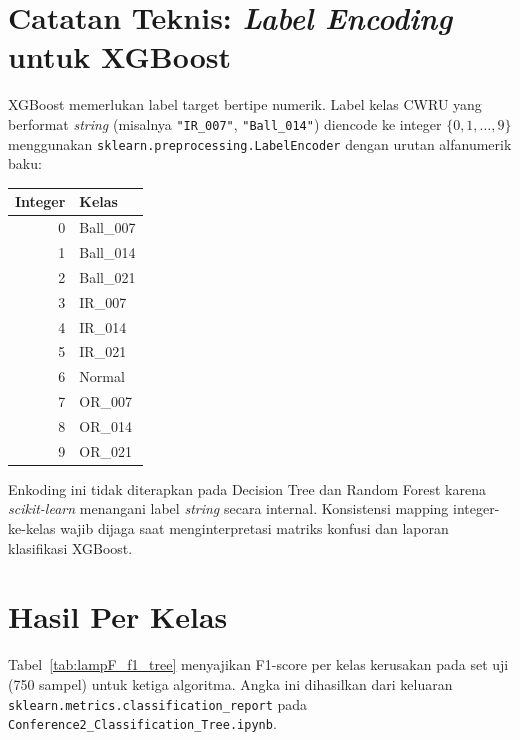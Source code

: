 \section{Catatan Teknis: \emph{Label Encoding} untuk XGBoost}
\label{lamp:tree_labelencoding}

XGBoost memerlukan label target bertipe numerik. Label kelas CWRU
yang berformat \emph{string} (misalnya \texttt{"IR\_007"},
\texttt{"Ball\_014"}) diencode ke integer $\{0, 1, \ldots, 9\}$
menggunakan \texttt{sklearn.preprocessing.LabelEncoder} dengan
urutan alfanumerik baku:

\begin{center}
\footnotesize
\begin{tabular}{@{}rl@{}}
  \toprule
  \textbf{Integer} & \textbf{Kelas} \\
  \midrule
  0 & Ball\_007 \\
  1 & Ball\_014 \\
  2 & Ball\_021 \\
  3 & IR\_007   \\
  4 & IR\_014   \\
  5 & IR\_021   \\
  6 & Normal    \\
  7 & OR\_007   \\
  8 & OR\_014   \\
  9 & OR\_021   \\
  \bottomrule
\end{tabular}
\end{center}

Enkoding ini tidak diterapkan pada Decision Tree dan Random Forest
karena \emph{scikit-learn} menangani label \emph{string}
secara internal. Konsistensi mapping integer-ke-kelas wajib
dijaga saat menginterpretasi matriks konfusi dan laporan klasifikasi
XGBoost.

\section{Hasil Per Kelas}
\label{lamp:tree_perclass}

Tabel~\ref{tab:lampF_f1_tree} menyajikan F1-score per kelas kerusakan
pada set uji (750 sampel) untuk ketiga algoritma. Angka ini dihasilkan
dari keluaran \texttt{sklearn.metrics.classification\_report} pada
\texttt{Conference2\_Classification\_Tree.ipynb}.

